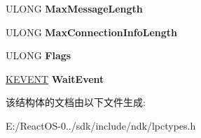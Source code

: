 \begin{DoxyCompactItemize}
\begin{tabbing}
\end{tabbing}\item 
\mbox{\label{struct___l_p_c_p___p_o_r_t___o_b_j_e_c_t_a909bb6917860accbf905502faca713f1}} 
U\+L\+O\+NG {\bfseries Max\+Message\+Length}
\item 
\mbox{\label{struct___l_p_c_p___p_o_r_t___o_b_j_e_c_t_afba504d587d11e8c9ccb4d7e0062dd82}} 
U\+L\+O\+NG {\bfseries Max\+Connection\+Info\+Length}
\item 
\mbox{\label{struct___l_p_c_p___p_o_r_t___o_b_j_e_c_t_a60e5d1300ee991c94df7c09c6e07e11c}} 
U\+L\+O\+NG {\bfseries Flags}
\item 
\mbox{\label{struct___l_p_c_p___p_o_r_t___o_b_j_e_c_t_adf9e8e64772f05d28c9d953eb2873ba0}} 
\hyperlink{struct___k_e_v_e_n_t}{K\+E\+V\+E\+NT} {\bfseries Wait\+Event}
\end{DoxyCompactItemize}


该结构体的文档由以下文件生成\+:\begin{DoxyCompactItemize}
\item 
E\+:/\+React\+O\+S-\/0../sdk/include/ndk/lpctypes.\+h\end{DoxyCompactItemize}
